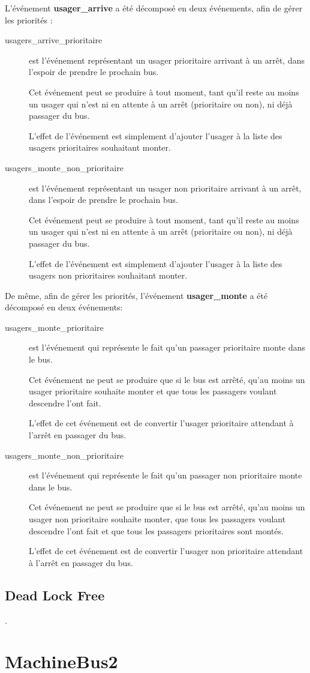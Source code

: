 \documentclass[a4paper,titlepage]{report}
\begin{document}
		L'événement \textbf{usager\_arrive} a été décomposé en deux événements, afin de gérer les priorités :
		\begin{description}
			\item[usagers\_arrive\_prioritaire] est l'événement représentant un usager prioritaire arrivant à un arrêt, dans l'espoir de prendre le prochain bus.
			
			Cet événement peut se produire à tout moment, tant qu'il reste au moins un usager qui n'est ni en attente à un arrêt (prioritaire ou non), ni déjà passager du bus.
			
			L'effet de l'événement est simplement d'ajouter l'usager à la liste des usagers prioritaires souhaitant monter.
			
			\item[usagers\_monte\_non\_prioritaire] est l'événement représentant un usager non prioritaire arrivant à un arrêt, dans l'espoir de prendre le prochain bus.
			
			Cet événement peut se produire à tout moment, tant qu'il reste au moins un usager qui n'est ni en attente à un arrêt (prioritaire ou non), ni déjà passager du bus.
			
			L'effet de l'événement est simplement d'ajouter l'usager à la liste des usagers non prioritaires souhaitant monter.\\
		\end{description}
		
\newpage
		De même, afin de gérer les priorités, l'événement \textbf{usager\_monte} a été décomposé en deux événements:
		
		\begin{description}
			\item[usagers\_monte\_prioritaire] est l'événement qui représente le fait qu'un passager prioritaire monte dans le bus.
			
			Cet événement ne peut se produire que si le bus est arrêté, qu'au moins un usager prioritaire souhaite monter et que tous les passagers voulant descendre l'ont fait.
			
			L'effet de cet événement est de convertir l'usager prioritaire attendant à l'arrêt en passager du bus.\\
			
			\item[usagers\_monte\_non\_prioritaire] est l'événement qui représente le fait qu'un passager non prioritaire monte dans le bus.
			
			Cet événement ne peut se produire que si le bus est arrêté, qu'au moins un usager non prioritaire souhaite monter, que tous les passagers voulant descendre l'ont fait et que tous les passagers prioritaires sont montés.
			
			L'effet de cet événement est de convertir l'usager non prioritaire attendant à l'arrêt en passager du bus.\\
		\end{description}

\subsection{Dead Lock Free}
	. 
	
	
	
	
	
\section{MachineBus2}	
		
		
\end{document}
